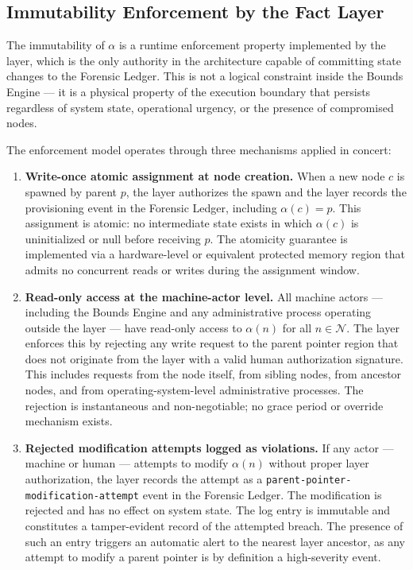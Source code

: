 \subsection{Immutability Enforcement by the Fact Layer}
\label{sec:immutability-enforcement}

The immutability of $\alpha$ is a runtime enforcement property implemented by the \fact{} layer, which is the only authority in the \bxthree{} architecture capable of committing state changes to the Forensic Ledger. This is not a logical constraint inside the Bounds Engine — it is a physical property of the execution boundary that persists regardless of system state, operational urgency, or the presence of compromised nodes.

The enforcement model operates through three mechanisms applied in concert:

\begin{enumerate}
\item[$\mathbf{F_1}$] \textbf{Write-once atomic assignment at node creation.} When a new node $c$ is spawned by parent $p$, the \purpose{} layer authorizes the spawn and the \fact{} layer records the provisioning event in the Forensic Ledger, including $\alpha(c) = p$. This assignment is atomic: no intermediate state exists in which $\alpha(c)$ is uninitialized or null before receiving $p$. The atomicity guarantee is implemented via a hardware-level or equivalent protected memory region that admits no concurrent reads or writes during the assignment window.

\item[$\mathbf{F_2}$] \textbf{Read-only access at the machine-actor level.} All machine actors — including the Bounds Engine and any administrative process operating outside the \purpose{} layer — have read-only access to $\alpha(n)$ for all $n \in \mathcal{N}$. The \fact{} layer enforces this by rejecting any write request to the parent pointer region that does not originate from the \purpose{} layer with a valid human authorization signature. This includes requests from the node itself, from sibling nodes, from ancestor nodes, and from operating-system-level administrative processes. The rejection is instantaneous and non-negotiable; no grace period or override mechanism exists.

\item[$\mathbf{F_3}$] \textbf{Rejected modification attempts logged as violations.} If any actor — machine or human — attempts to modify $\alpha(n)$ without proper \purpose{} layer authorization, the \fact{} layer records the attempt as a \texttt{parent-pointer-modification-attempt} event in the Forensic Ledger. The modification is rejected and has no effect on system state. The log entry is immutable and constitutes a tamper-evident record of the attempted breach. The presence of such an entry triggers an automatic alert to the nearest \purpose{} layer ancestor, as any attempt to modify a parent pointer is by definition a high-severity event.
\end{enumerate}

